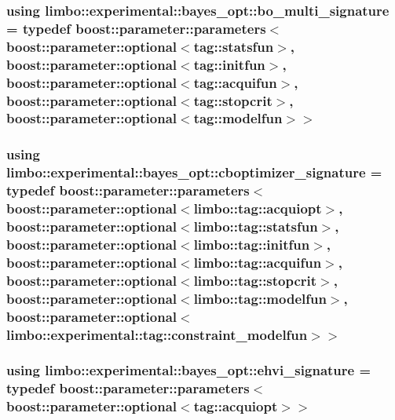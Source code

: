 \subsubsection[{bo\+\_\+multi\+\_\+signature}]{\setlength{\rightskip}{0pt plus 5cm}using {\bf limbo\+::experimental\+::bayes\+\_\+opt\+::bo\+\_\+multi\+\_\+signature} = typedef boost\+::parameter\+::parameters$<$boost\+::parameter\+::optional$<$tag\+::statsfun$>$, boost\+::parameter\+::optional$<$tag\+::initfun$>$, boost\+::parameter\+::optional$<$tag\+::acquifun$>$, boost\+::parameter\+::optional$<$tag\+::stopcrit$>$, boost\+::parameter\+::optional$<$tag\+::modelfun$>$$>$}\label{namespacelimbo_1_1experimental_1_1bayes__opt_a571329d2f0470956331c4fbdf32a2a6f}
\hypertarget{namespacelimbo_1_1experimental_1_1bayes__opt_ae227a617e3c612fe31b87959b23da719}{}
\subsubsection[{cboptimizer\+\_\+signature}]{\setlength{\rightskip}{0pt plus 5cm}using {\bf limbo\+::experimental\+::bayes\+\_\+opt\+::cboptimizer\+\_\+signature} = typedef boost\+::parameter\+::parameters$<$boost\+::parameter\+::optional$<$limbo\+::tag\+::acquiopt$>$, boost\+::parameter\+::optional$<$limbo\+::tag\+::statsfun$>$, boost\+::parameter\+::optional$<$limbo\+::tag\+::initfun$>$, boost\+::parameter\+::optional$<$limbo\+::tag\+::acquifun$>$, boost\+::parameter\+::optional$<$limbo\+::tag\+::stopcrit$>$, boost\+::parameter\+::optional$<$limbo\+::tag\+::modelfun$>$, boost\+::parameter\+::optional$<$limbo\+::experimental\+::tag\+::constraint\+\_\+modelfun$>$$>$}\label{namespacelimbo_1_1experimental_1_1bayes__opt_ae227a617e3c612fe31b87959b23da719}
\hypertarget{namespacelimbo_1_1experimental_1_1bayes__opt_ae8eff4654db4ec2db25b12dcb2a18b52}{}
\subsubsection[{ehvi\+\_\+signature}]{\setlength{\rightskip}{0pt plus 5cm}using {\bf limbo\+::experimental\+::bayes\+\_\+opt\+::ehvi\+\_\+signature} = typedef boost\+::parameter\+::parameters$<$boost\+::parameter\+::optional$<$tag\+::acquiopt$>$$>$}\label{namespacelimbo_1_1experimental_1_1bayes__opt_ae8eff4654db4ec2db25b12dcb2a18b52}
\hypertarget{namespacelimbo_1_1experimental_1_1bayes__opt_acbfe5ad9b42be948de5ebb46bdc9dd01}{}
